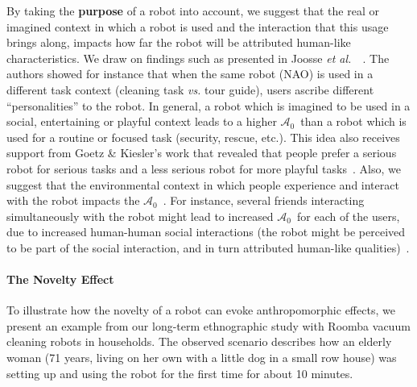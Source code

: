 \documentclass{frontiersSCNS} %
\newcommand{\etal}{{\textit{et al.~}}}
\newcommand{\ICA}{{$\mathcal{A}_0$~}}
\begin{document}
By taking the \textbf{purpose} of a robot into account, we suggest that the real
or imagined context in which a robot is used and the interaction that this usage
brings along, impacts how far the robot will be attributed human-like
characteristics. We draw on findings such as presented in Joosse
\etal~\cite{joosse_what_2013}. The authors showed for instance that when the
same robot (NAO) is used in a different task context (cleaning task \emph{vs.}
tour guide), users ascribe different ``personalities'' to the robot. In general,
a robot which is imagined to be used in a social, entertaining or playful
context leads to a higher \ICA than a robot which is used for a routine or
focused task (security, rescue, etc.). This idea also receives support from
Goetz \& Kiesler's work that revealed that people prefer a serious robot for
serious tasks and a less serious robot for more playful
tasks~\cite{goetz_cooperation_2002, goetz_matching_2003}. Also, we suggest that
the environmental context in which people experience and interact with the robot
impacts the \ICA. For instance, several friends interacting simultaneously with
the robot might lead to increased \ICA for each of the users, due to increased
human-human social interactions (the robot might be perceived to be part of the
social interaction, and in turn attributed human-like
qualities)~\cite{baxter2013do}.

\paragraph{The Novelty Effect}
\label{sec:noveltyeffect}


To illustrate how the novelty of a robot can evoke anthropomorphic effects, we
present an example from our long-term ethnographic study with Roomba vacuum
cleaning robots in households. The observed scenario describes how an elderly
woman (71 years, living on her own with a little dog in a small row house) was
setting up and using the robot for the first time for about 10 minutes.
\end{document}
